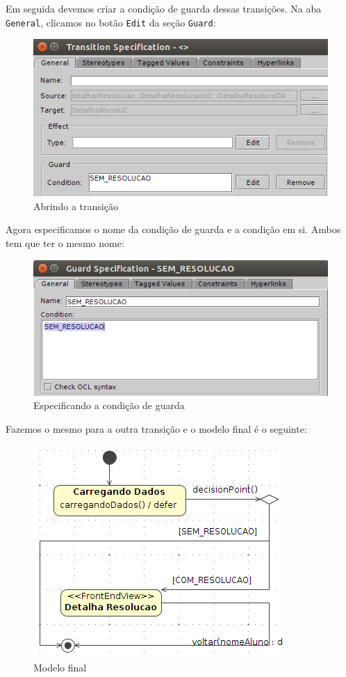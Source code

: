 Em seguida devemos criar a condição de guarda dessas transições. Na aba
\texttt{General}, clicamos no botão \texttt{Edit} da seção \texttt{Guard}:

\begin{figure}[H]
	\centering
	\includegraphics[scale=0.75]{files/imgs/decision-point-05.png}
	\caption{Abrindo a transição}
	\label{abrindo_transição}
\end{figure}

Agora especificamos o nome da condição de guarda e a condição em si. Ambos tem
que ter o mesmo nome:

\begin{figure}[H]
	\centering
	\includegraphics[scale=0.75]{files/imgs/decision-point-06.png}
	\caption{Especificando a condição de guarda}
	\label{condicao_de_guarda}
\end{figure}

Fazemos o mesmo para a outra transição e o modelo final é o seguinte:

\begin{figure}[H]
	\centering
	\includegraphics[scale=0.75]{files/imgs/decision-point-07.png}
	\caption{Modelo final}
	\label{modelo_final}
\end{figure}

